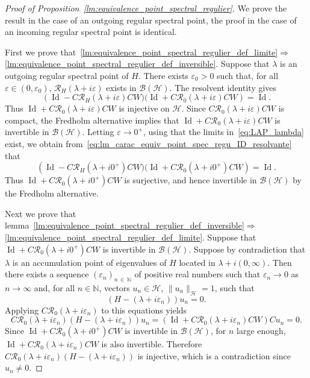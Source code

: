 \documentclass[AHL,Unicode,longabstracts,published]{cedram}
\newcommand{\Hi}{\mathcal{H}}
\newcommand{\N}{\mathbb{N}}
\newcommand{\Res}{\mathcal{R}}
\newcommand{\clB}{\mathcal{B}}
\DeclareMathOperator{\Id}{Id}
\newcommand{\Hi}{\mathcal{H}}
\begin{document}
\begin{proof}[Proof of Proposition~\ref{lm:equivalence_point_spectral_regulier}]
We prove the result in the case of an outgoing regular spectral point, the proof in the case of an incoming regular spectral point is identical.

First we prove that~\eqref{lm:equivalence_point_spectral_regulier_def_limite}$\Rightarrow$\eqref{lm:equivalence_point_spectral_regulier_def_inversible}. Suppose that $\lambda$ is an outgoing regular spectral point of $H$. There exists $\varepsilon_0>0$ such that, for all $\varepsilon\in(0,\varepsilon_0)$, $\Res_H(\lambda+ i\varepsilon)$ exists in $\clB(\Hi)$. The resolvent identity gives
\begin{equation}\label{eq:lm_carac_equiv_point_spec_regu_ID_resolvante}
\left(\Id-C\Res_H(\lambda+ i\varepsilon)CW)(\Id+C\Res_0(\lambda+ i\varepsilon)CW\right)=\Id.
\end{equation}
Thus $\Id+C\Res_0(\lambda+i\varepsilon)CW$ is injective on $\Hi$. Since $C\Res_0(\lambda+i\varepsilon)CW$ is compact, the Fredholm alternative implies that $\Id+C\Res_0(\lambda+i\varepsilon)CW$ is invertible in $\clB(\Hi)$. Letting $\varepsilon\to0^+$, using that the limits in~\eqref{eq:LAP_lambda} exist, we obtain from~\eqref{eq:lm_carac_equiv_point_spec_regu_ID_resolvante} that
\begin{equation*}
\left(\Id-C\Res_H(\lambda+i0^+)CW)(\Id+C\Res_0(\lambda+i0^+)CW\right)=\Id.
\end{equation*}
Thus $\Id+C\Res_0(\lambda+ i0^+)CW$ is surjective, and hence invertible in $\clB(\Hi)$ by the Fredholm alternative.

Next we prove that lemma~\eqref{lm:equivalence_point_spectral_regulier_def_inversible}$\Rightarrow$\eqref{lm:equivalence_point_spectral_regulier_def_limite}. Suppose that $\Id+C\Res_0(\lambda+ i0^+)CW$ is invertible in $\clB(\Hi)$. Suppose by contradiction that $\lambda$ is an accumulation point of eigenvalues of $H$ located in $\lambda +i(0,\infty)$. Then there exists a sequence $(\varepsilon_n)_{n\,\in\,\N}$ of positive real numbers such that $\varepsilon_n\to0$ as $n\to\infty$ and, for all $n\in\N$, vectors $u_n\in\Hi$, $\|u_n\|_\Hi=1$, such that
\begin{equation*}
(H-(\lambda+ i\varepsilon_n))u_n=0.
\end{equation*}
Applying $C\Res_0(\lambda+ i\varepsilon_n)$ to this equations yields
\begin{equation*}
C\Res_0(\lambda+ i\varepsilon_n)(H-(\lambda+i\varepsilon_n))u_n=(\Id+C\Res_0(\lambda+ i\varepsilon_n)CW)Cu_n=0.
\end{equation*}
Since $\Id+C\Res_0(\lambda+ i0^+)CW$ is invertible in $\clB(\Hi)$, for $n$ large enough, $\Id+C\Res_0(\lambda+ i\varepsilon_n)CW$ is also invertible. Therefore $C\Res_0(\lambda+ i\varepsilon_n)(H-(\lambda+ i\varepsilon_n))$ is injective, which is a contradiction since $u_n\neq 0$.


\end{proof}
\end{document}
